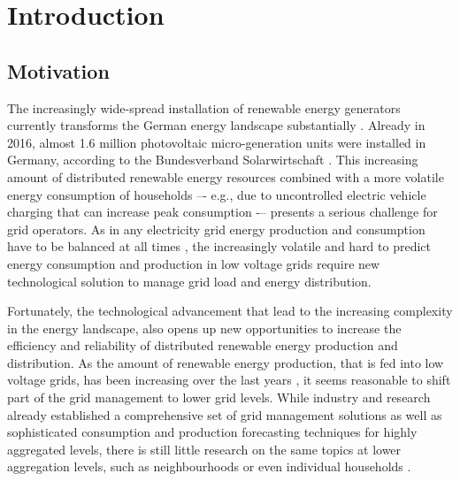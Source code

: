
\section{Introduction}\label{Sec:Intro}




\subsection{Motivation}\label{Sec:Intro;Subsec:Motivation}

The increasingly wide-spread installation of renewable energy generators currently transforms the German energy landscape substantially \citep{Bayer:2018}. Already in 2016, almost 1.6 million photovoltaic micro-generation units were installed in Germany, according to the Bundesverband Solarwirtschaft \citep{BSW-Solar:2017}. This increasing amount of distributed renewable energy resources combined with a more volatile energy consumption of households –- e.g., due to uncontrolled electric vehicle charging that can increase peak consumption \citep{Fitzgerald:2016,Floch:2017} -– presents a serious challenge for grid operators. As in any electricity grid energy production and consumption have to be balanced at all times \citep{Weron:2006}, the increasingly volatile and hard to predict energy consumption and production in low voltage grids require new technological solution to manage grid load and energy distribution.

Fortunately, the technological advancement that lead to the increasing complexity in the energy landscape, also opens up new opportunities to increase the efficiency and reliability of distributed renewable energy production and distribution. As the amount of renewable energy production, that is fed into low voltage grids, has been increasing over the last years \citep{Bayer:2018}, it seems reasonable to shift part of the grid management to lower grid levels. While industry and research already established a comprehensive set of grid management solutions as well as sophisticated consumption and production forecasting techniques for highly aggregated levels, there is still little research on the same topics at lower aggregation levels, such as neighbourhoods or even individual households \citep{Meer:2018}.

